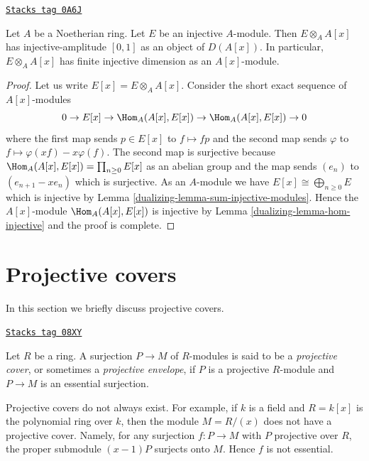 \begin{lemma}
\label{dualizing-lemma-injective-dimension-over-polynomial-ring}
\href{https://stacks.math.columbia.edu/tag/0A6J}{\texttt{Stacks tag 0A6J}}

Let $A$ be a Noetherian ring. Let $E$ be an injective $A$-module.
Then $E \otimes_A A[x]$ has injective-amplitude $[0, 1]$
as an object of $D(A[x])$. In particular, $E \otimes_A A[x]$
has finite injective dimension as an $A[x]$-module.
\end{lemma}

\begin{proof}

Let us write $E[x] = E \otimes_A A[x]$. Consider the short exact
sequence of $A[x]$-modules
$$
0 \to E[x] \to \Hom_A(A[x], E[x]) \to \Hom_A(A[x], E[x]) \to 0
$$
where the first map sends $p \in E[x]$ to $f \mapsto fp$ and the
second map sends $\varphi$ to $f \mapsto \varphi(xf) - x\varphi(f)$.
The second map is surjective because
$\Hom_A(A[x], E[x]) = \prod_{n \geq 0} E[x]$ as an abelian group and
the map sends $(e_n)$ to $(e_{n + 1} - xe_n)$ which is surjective.
As an $A$-module we have $E[x] \cong \bigoplus_{n \geq 0} E$
which is injective by Lemma \ref{dualizing-lemma-sum-injective-modules}.
Hence the $A[x]$-module $\Hom_A(A[x], E[x])$ is injective by
Lemma \ref{dualizing-lemma-hom-injective} and the proof is complete.
\end{proof}

\section{Projective covers}
\label{dualizing-section-projective-cover}
In this section we briefly discuss projective covers.

\begin{definition}
\label{dualizing-definition-projective-cover}
\href{https://stacks.math.columbia.edu/tag/08XY}{\texttt{Stacks tag 08XY}}

Let $R$ be a ring. A surjection $P \to M$ of $R$-modules is said
to be a {\it projective cover}, or sometimes a {\it projective envelope},
if $P$ is a projective $R$-module and $P \to M$ is an essential
surjection.
\end{definition}

Projective covers do not always exist. For example, if $k$ is a field
and $R = k[x]$ is the polynomial ring over $k$, then the module $M = R/(x)$
does not have a projective cover. Namely, for any surjection $f : P \to M$
with $P$ projective over $R$, the proper submodule $(x - 1)P$ surjects
onto $M$. Hence $f$ is not essential.

